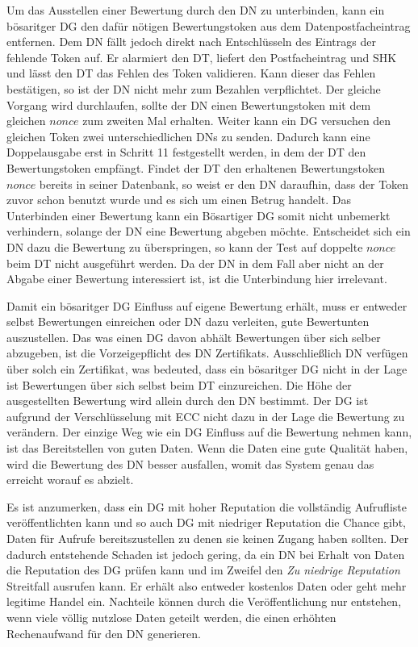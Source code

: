 \documentclass[
	fontsize=11pt,
	headings=small,
	parskip=half,           %
	bibliography=totoc,
	numbers=noenddot,       %
	open=any,               %
]{scrreprt}
\begin{document}
Um das Ausstellen einer Bewertung durch den DN zu unterbinden, kann ein bösaritger DG den dafür nötigen Bewertungstoken aus dem Datenpostfacheintrag entfernen. Dem DN fällt jedoch direkt nach Entschlüsseln des Eintrags der fehlende Token auf. Er alarmiert den DT, liefert den Postfacheintrag und SHK und lässt den DT das Fehlen des Token validieren. Kann dieser das Fehlen bestätigen, so ist der DN nicht mehr zum Bezahlen verpflichtet. Der gleiche Vorgang wird durchlaufen, sollte der DN einen Bewertungstoken mit dem gleichen $nonce$ zum zweiten Mal erhalten. Weiter kann ein DG versuchen den gleichen Token zwei unterschiedlichen DNs zu senden. Dadurch kann eine Doppelausgabe erst in Schritt 11 festgestellt werden, in dem der DT den Bewertungstoken empfängt. Findet der DT den erhaltenen Bewertungstoken $nonce$ bereits in seiner Datenbank, so weist er den DN daraufhin, dass der Token zuvor schon benutzt wurde und es sich um einen Betrug handelt. Das Unterbinden einer Bewertung kann ein Bösartiger DG somit nicht unbemerkt verhindern, solange der DN eine Bewertung abgeben möchte. Entscheidet sich ein DN dazu die Bewertung zu überspringen, so kann der Test auf doppelte $nonce$ beim DT nicht ausgeführt werden. Da der DN in dem Fall aber nicht an der Abgabe einer Bewertung interessiert ist, ist die Unterbindung hier irrelevant.

Damit ein bösaritger DG Einfluss auf eigene Bewertung erhält, muss er entweder selbst Bewertungen einreichen oder DN dazu verleiten, gute Bewertunten auszustellen. Das was einen DG davon abhält Bewertungen über sich selber abzugeben, ist die Vorzeigepflicht des DN Zertifikats. Ausschließlich DN verfügen über solch ein Zertifikat, was bedeuted, dass ein bösaritger DG nicht in der Lage ist Bewertungen über sich selbst beim DT einzureichen. Die Höhe der ausgestellten Bewertung wird allein durch den DN bestimmt. Der DG ist aufgrund der Verschlüsselung mit ECC nicht dazu in der Lage die Bewertung zu verändern. Der einzige Weg wie ein DG Einfluss auf die Bewertung nehmen kann, ist das Bereitstellen von guten Daten. Wenn die Daten eine gute Qualität haben, wird die Bewertung des DN besser ausfallen, womit das System genau das erreicht worauf es abzielt.

Es ist anzumerken, dass ein DG mit hoher Reputation die vollständig Aufrufliste veröffentlichten kann und so auch DG mit niedriger Reputation die Chance gibt, Daten für Aufrufe bereitszustellen zu denen sie keinen Zugang haben sollten. Der dadurch entstehende Schaden ist jedoch gering, da ein DN bei Erhalt von Daten die Reputation des DG prüfen kann und im Zweifel den \textit{Zu niedrige Reputation} Streitfall ausrufen kann. Er erhält also entweder kostenlos Daten oder geht mehr legitime Handel ein. Nachteile können durch die Veröffentlichung nur entstehen, wenn viele völlig nutzlose Daten geteilt werden, die einen erhöhten Rechenaufwand für den DN generieren.
\end{document}
